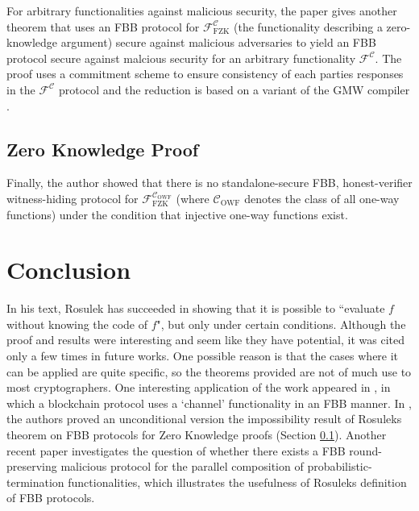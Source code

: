 \documentclass[11pt]{article}
\theoremstyle{theorem}
\theoremstyle{theorem}
\theoremstyle{remark}
\theoremstyle{note}
\theoremstyle{plain}
\theoremstyle{definition}
\begin{document}
For arbitrary functionalities against malicious security, the paper gives another theorem that uses an FBB protocol for $\mathcal{F}^\mathcal{C}_\text{FZK}$ (the functionality describing a zero-knowledge argument) secure against malicious adversaries to yield an FBB protocol secure against malcious security for an arbitrary functionality $\mathcal{F}^\mathcal{C}$. The proof uses a commitment scheme to ensure consistency of each parties responses in the $\mathcal{F}^\mathcal{C}$ protocol and the reduction is based on a variant of the GMW compiler \cite{STOC:GolMicWig87}.

\subsection{Zero Knowledge Proof} \label{section-zk}
Finally, the author showed that there is no standalone-secure FBB, honest-verifier witness-hiding protocol for $\mathcal{F}^{\mathcal{C}_\text{OWF}}_\text{FZK}$ (where $\mathcal{C}_\text{OWF}$ denotes the class of all one-way functions) under the condition that injective one-way functions exist.

\section{Conclusion}
In his text, Rosulek has succeeded in showing that it is possible to ``evaluate $f$ without knowing the code of $f$", but only under certain conditions. Although the proof and results were interesting and seem like they have potential, it was cited only a few times in future works. One possible reason is that the cases where it can be applied are quite specific, so the theorems provided are not of much use to most cryptographers. One interesting application of the work appeared in \cite{C:BMTZ17}, in which a blockchain protocol uses a `channel' functionality in an FBB manner. In \cite{C:IKPSY16}, the authors proved an unconditional version the impossibility result of Rosuleks theorem on FBB protocols for Zero Knowledge proofs (Section \ref{section-zk}). Another recent paper \cite{ICALP:CCGZ17} investigates the question of whether there exists a FBB round-preserving malicious protocol for the parallel composition of probabilistic-termination functionalities, which illustrates the usefulness of Rosuleks definition of FBB protocols.




\end{document}
